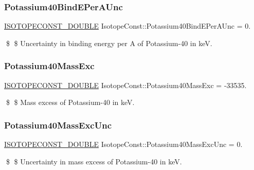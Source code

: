 \subsubsection{\texorpdfstring{Potassium40\+Bind\+E\+Per\+A\+Unc}{Potassium40BindEPerAUnc}}
{\footnotesize\ttfamily \mbox{\hyperlink{group___isotope_const-_macros_ga8f45a7272ce02c0b4c65c44636ed719a}{I\+S\+O\+T\+O\+P\+E\+C\+O\+N\+S\+T\+\_\+\+D\+O\+U\+B\+LE}} Isotope\+Const\+::\+Potassium40\+Bind\+E\+Per\+A\+Unc = 0.}

\$ \$ Uncertainty in binding energy per A of Potassium-\/40 in keV. \mbox{\label{group___isotope_const-_potassium-_k40_ga3cec33408ada2b1ab3b412ab5b810436}} 
\subsubsection{\texorpdfstring{Potassium40\+Mass\+Exc}{Potassium40MassExc}}
{\footnotesize\ttfamily \mbox{\hyperlink{group___isotope_const-_macros_ga8f45a7272ce02c0b4c65c44636ed719a}{I\+S\+O\+T\+O\+P\+E\+C\+O\+N\+S\+T\+\_\+\+D\+O\+U\+B\+LE}} Isotope\+Const\+::\+Potassium40\+Mass\+Exc = -\/33535.}

\$ \$ Mass excess of Potassium-\/40 in keV. \mbox{\label{group___isotope_const-_potassium-_k40_gaf873a926b25822db7d8591dd9848e2c9}} 
\subsubsection{\texorpdfstring{Potassium40\+Mass\+Exc\+Unc}{Potassium40MassExcUnc}}
{\footnotesize\ttfamily \mbox{\hyperlink{group___isotope_const-_macros_ga8f45a7272ce02c0b4c65c44636ed719a}{I\+S\+O\+T\+O\+P\+E\+C\+O\+N\+S\+T\+\_\+\+D\+O\+U\+B\+LE}} Isotope\+Const\+::\+Potassium40\+Mass\+Exc\+Unc = 0.}

\$ \$ Uncertainty in mass excess of Potassium-\/40 in keV. \mbox{\label{group___isotope_const-_potassium-_k40_ga9a5d54c76d82faec0db02b83d116deb7}} 
